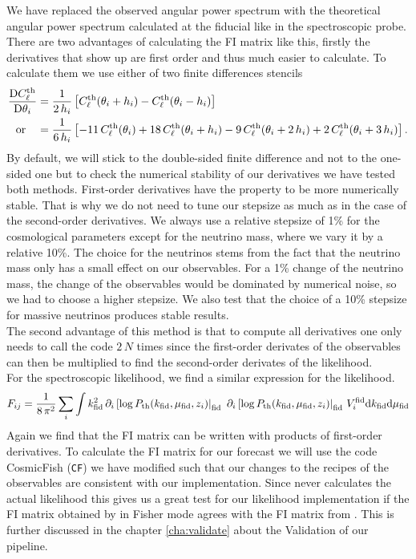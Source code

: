 \documentclass[../main.tex]{subfiles}
\begin{document}
We have replaced the observed angular power spectrum with the theoretical angular power spectrum calculated at the fiducial like in the spectroscopic probe. There are two advantages of calculating the FI matrix like this, firstly the derivatives that show up are first order and thus much easier to calculate. To calculate them we use either of two finite differences stencils 
\begin{align}
\frac{\mathrm{D} C^\mathrm{th}_\ell}{\mathrm{D} \theta_i} &= \frac{1}{2\,h_i}\left[C^\mathrm{th}_\ell(\theta_i+h_i)-C^\mathrm{th}_\ell(\theta_i-h_i)\right]\\
\text{or}\quad&= \frac{1}{6\,h_i}\left[-11\,C^\mathrm{th}_\ell(\theta_i)+18\,C^\mathrm{th}_\ell(\theta_i+h_i)-9\,C^\mathrm{th}_\ell(\theta_i+2\,h_i)+2\,C^\mathrm{th}_\ell(\theta_i+3\,h_i)\right].
\end{align}
By default, we will stick to the double-sided finite difference and not to the one-sided one but to check the numerical stability of our derivatives we have tested both methods. First-order derivatives have the property to be more numerically stable. That is why we do not need to tune our stepsize as much as in the case of the second-order derivatives. We always use a relative stepsize of 1\% for the cosmological parameters except for the neutrino mass, where we vary it by a relative 10\%. The choice for the neutrinos stems from the fact that the neutrino mass only has a small effect on our observables. For a 1\% change of the neutrino mass, the change of the observables would be dominated by numerical noise, so we had to choose a higher stepsize. We also test that the choice of a 10\% stepsize for massive neutrinos produces stable results.\\
The second advantage of this method is that to compute all derivatives one only needs to call the code $2\, N$ times since the first-order derivates of the observables can then be multiplied to find the second-order derivates of the likelihood.\\
For the spectroscopic likelihood, we find a similar expression for the likelihood. \begin{equation}
    F_{ij} = \frac{1}{8\,\pi^2}\sum_i \int k_\mathrm{fid}^2 \,\partial_i \left[\log P_\mathrm{th}(k_\mathrm{fid},\mu_\mathrm{fid},z_i) \right|_\mathrm{fid}\,\,\partial_i \left[\log P_\mathrm{th}(k_\mathrm{fid},\mu_\mathrm{fid},z_i)\right|_\mathrm{fid}\,V_i^\mathrm{fid} \mathrm{d} k_\mathrm{fid} \mathrm{d} \mu_\mathrm{fid}  
\end{equation}
Again we find that the FI matrix can be written with products of first-order derivatives. To calculate the FI matrix for our forecast we will use the code CosmicFish ({\tt CF})\cite{Raveri:2016leq} we have modified such that our changes to the recipes of the observables are consistent with our \montepython implementation. Since \cosmicfish never calculates the actual likelihood this gives us a great test for our likelihood implementation if the FI matrix obtained by \montepython in Fisher mode agrees with the FI matrix from \cosmicfish. This is further discussed in the chapter \ref{cha:validate} about the Validation of our pipeline.\\
\end{document}
